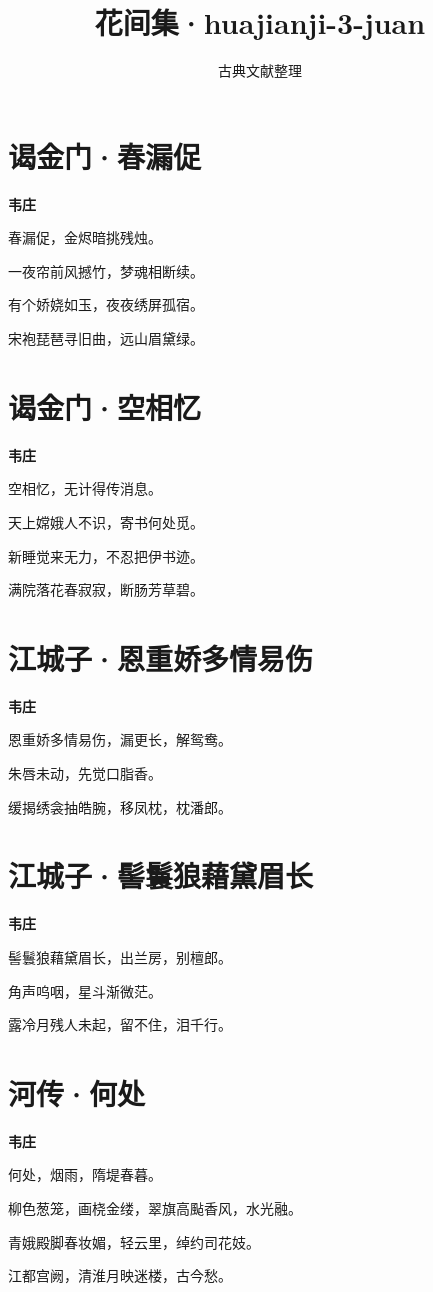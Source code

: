 \documentclass[12pt,a4paper]{ctexbook}
\title{花间集·huajianji-3-juan}
\author{古典文献整理}
\date{}
\begin{document}
\maketitle
\tableofcontents
\newpage
\section{谒金门·春漏促}
\textbf{韦庄}\par\vspace{0.5em}
春漏促，金烬暗挑残烛。\par
一夜帘前风撼竹，梦魂相断续。\par
有个娇娆如玉，夜夜绣屏孤宿。\par
宋袍琵琶寻旧曲，远山眉黛绿。\par

\section{谒金门·空相忆}
\textbf{韦庄}\par\vspace{0.5em}
空相忆，无计得传消息。\par
天上嫦娥人不识，寄书何处觅。\par
新睡觉来无力，不忍把伊书迹。\par
满院落花春寂寂，断肠芳草碧。\par

\section{江城子·恩重娇多情易伤}
\textbf{韦庄}\par\vspace{0.5em}
恩重娇多情易伤，漏更长，解鸳鸯。\par
朱唇未动，先觉口脂香。\par
缓揭绣衾抽皓腕，移凤枕，枕潘郎。\par

\section{江城子·髻鬟狼藉黛眉长}
\textbf{韦庄}\par\vspace{0.5em}
髻鬟狼藉黛眉长，出兰房，别檀郎。\par
角声呜咽，星斗渐微茫。\par
露冷月残人未起，留不住，泪千行。\par

\section{河传·何处}
\textbf{韦庄}\par\vspace{0.5em}
何处，烟雨，隋堤春暮。\par
柳色葱笼，画桡金缕，翠旗高颭香风，水光融。\par
青娥殿脚春妆媚，轻云里，绰约司花妓。\par
江都宫阙，清淮月映迷楼，古今愁。\par
\end{document}
